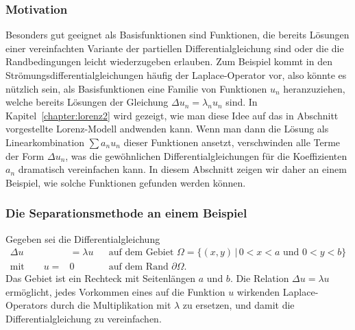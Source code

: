 \subsubsection{Motivation}
Besonders gut geeignet als Basisfunktionen sind Funktionen, die bereits
Lösungen einer vereinfachten Variante der partiellen Differentialgleichung
sind oder die die Randbedingungen leicht wiederzugeben erlauben.
Zum Beispiel kommt in den Strömungsdifferentialgleichungen häufig der
Laplace-Operator vor, also könnte es nützlich sein, als Basisfunktionen
eine Familie von Funktionen $u_n$ heranzuziehen, welche bereits Lösungen
der Gleichung $\Delta u_n=\lambda_nu_n$ sind.
In Kapitel~\ref{chapter:lorenz2} wird
gezeigt, wie man diese Idee auf das in
Abschnitt~\label{section:lorenz-modell} vorgestellte Lorenz-Modell
andwenden kann.
Wenn man dann die Lösung als Linearkombination $\sum a_nu_n$ dieser Funktionen
ansetzt, verschwinden alle Terme der Form $\Delta u_n$, was die gewöhnlichen
Differentialgleichungen für die Koeffizienten $a_n$ dramatisch vereinfachen
kann.
In diesem Abschnitt zeigen wir daher an einem Beispiel, wie solche Funktionen
gefunden werden können. 

\subsubsection{Die Separationsmethode an einem Beispiel}
Gegeben sei die Differentialgleichung
\[
\begin{aligned}
\Delta u &= \lambda u&&
\text{auf dem Gebiet $\Omega=\{ (x,y)\,|\, 0<x<a\text{ und }0<y<b\}$}
\\
\text{mit}
\qquad
u=&0&&\text{auf dem Rand $\partial\Omega$.}
\end{aligned}
\]
Das Gebiet ist ein Rechteck mit Seitenlängen $a$ und $b$.
Die Relation $\Delta u=\lambda u$ ermöglicht, jedes Vorkommen eines auf
die Funktion $u$ wirkenden Laplace-Operators durch die Multiplikation
mit $\lambda$ zu ersetzen, und damit die Differentialgleichung zu vereinfachen.

